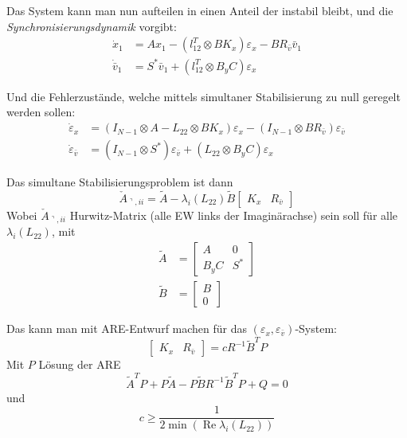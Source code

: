 Das System kann man nun aufteilen in einen Anteil der instabil bleibt, und die
\emph{Synchronisierungsdynamik} vorgibt:
\begin{align}
    \dot{x}_1 &= Ax_1 - (l_{12}^T \otimes BK_x)\varepsilon_x - BR_{\bar{v}}\bar{v}_1 \\
    \dot{\bar{v}}_1 &= S^*\bar{v}_1 + (l_{12}^T \otimes B_y C)\varepsilon_x
\end{align}

Und die Fehlerzustände, welche mittels simultaner Stabilisierung
zu null geregelt werden sollen:
\begin{align}
    \dot{\varepsilon}_x &= (I_{N-1} \otimes A - L_{22} \otimes BK_x) \varepsilon_x - (I_{N-1} \otimes BR_{\bar{v}}) \varepsilon_{\bar{v}} \\
    \dot{\varepsilon}_{\bar{v}} &= (I_{N-1} \otimes S^*) \varepsilon_{\bar{v}} + (L_{22} \otimes B_y C) \varepsilon_x
\end{align}

Das simultane Stabilisierungsproblem ist dann
\begin{equation}
    \check{A}_{\urcorner, ii} = \tilde{A} - \lambda_i(L_{22}) \tilde{B} \begin{bmatrix}
        K_x & R_{\bar{v}}
    \end{bmatrix}
\end{equation}
Wobei $\check{A}_{\urcorner, ii}$ Hurwitz-Matrix (alle EW links der Imaginärachse)
sein soll für alle $\lambda_i(L_{22})$, mit
\begin{align}
    \tilde{A} &= \begin{bmatrix}
        A & 0 \\
        B_y C & S^*
    \end{bmatrix} \\
    \tilde{B} &= \begin{bmatrix}
        B \\ 0
    \end{bmatrix}
\end{align}

Das kann man mit ARE-Entwurf machen für das $(\varepsilon_x, \varepsilon_{\bar{v}})$-System:
\begin{equation}
    \boxed{
    \begin{bmatrix}
        K_x & R_{\bar{v}}
    \end{bmatrix}
    = cR^{-1}\tilde{B}^TP
    }
\end{equation}
Mit $P$ Lösung der ARE
\begin{equation}
    \tilde{A}^TP + P\tilde{A}-P\tilde{B}R^{-1}\tilde{B}^TP+Q = 0
\end{equation}
und
\begin{equation}
    c \geq \frac{1}{2 \min (\operatorname{Re} \lambda_i(L_{22}))}
\end{equation}


